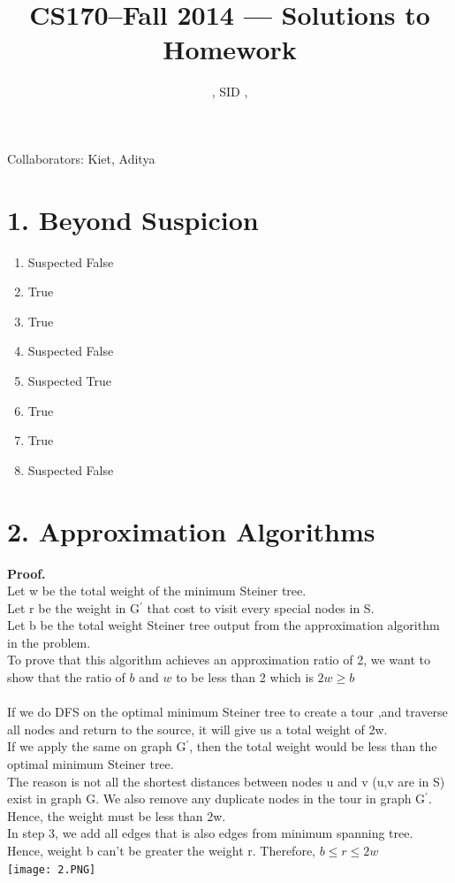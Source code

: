\documentclass[11pt]{article}
\title{CS170--Fall 2014 --- Solutions to Homework \Homework}
\author{\Name, SID \SID, \texttt{\Login}}
\newenvironment{qparts}{\begin{enumerate}[{(}a{)}]}{\end{enumerate}}
\begin{document}
\maketitle

\noindent
Collaborators: Kiet, Aditya



\section*{1. Beyond Suspicion}
\begin{qparts}
\item Suspected False
\item True
\item True
\item Suspected False
\item Suspected True
\item True
\item True
\item Suspected False
\end{qparts}

\newpage
\section*{2. Approximation Algorithms}


\textbf{Proof.}\\
Let w be the total weight of the minimum Steiner tree.\\
Let r be the weight in G$^\prime$ that cost to visit every special nodes in S.\\
Let b be the total weight Steiner tree output from the approximation algorithm in the problem.\\
To prove that this algorithm achieves an approximation ratio of 2, we want to show that 
the ratio of $b$ and $w$ to be less than 2 which is $2w \geq b$\\
\\
If we do DFS on the optimal minimum Steiner tree to create a tour ,and traverse all nodes and return to the source, it will give us a total weight of 2w.\\
If we apply the same on graph G$^\prime$, then the total weight would be less than the optimal minimum Steiner tree.\\
The reason is not all the shortest distances between nodes u and v (u,v are in S) exist in graph G. We also remove any duplicate nodes in the tour in graph G$^\prime$. Hence, the weight must be less than 2w.\\
In step 3, we add all edges that is also edges from minimum spanning tree. Hence, weight b can't be greater the weight r. Therefore, $b \leq r \leq 2w$\\
\texttt{[image: 2.PNG]}
\newpage
\end{document}

